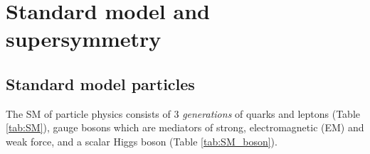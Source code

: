 
\chapter{Standard model and supersymmetry} %

\label{Chap1} %


\newcommand{\keyword}[1]{\textbf{#1}}
\newcommand{\tabhead}[1]{\textbf{#1}}
\newcommand{\code}[1]{\texttt{#1}}
\newcommand{\file}[1]{\texttt{\bfseries#1}}
\newcommand{\option}[1]{\texttt{\itshape#1}}

\section{Standard model particles}
The SM of particle physics consists of 3 \textit{generations} of quarks and leptons (Table \ref{tab:SM}), gauge bosons which are mediators 
of strong, electromagnetic (EM) and weak force, and a scalar Higgs boson (Table \ref{tab:SM_boson}).

